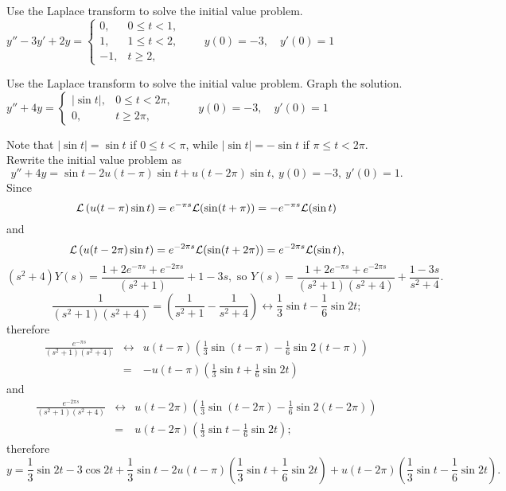 \documentclass{ximera}
\begin{document}
\begin{problem}\label{exer:8.5.5} Use the Laplace transform to solve the initial value problem.
$y''-3y'+2y= \left\{\begin{array}{rl} 0,&0\le
t<1,\\ 1,&1\le t<2,\\ -1,&t\ge 2,\end{array}\right.\qquad y(0)=-3,\quad y'(0)=1$
\end{problem}

\begin{problem}\label{exer:8.5.6} Use the Laplace transform to solve the initial value problem.  Graph the solution. 
$y''+4y= \left\{\begin{array}{cl}|\sin
t|,&0\le t<2\pi,\\ 0,&t\ge 2\pi,\end{array}\right.\qquad
y(0)=-3,\quad y'(0)=1$

\begin{solution}
Note that $|\sin t|=\sin t$ if $0\le t<\pi$, while
 $|\sin t|=-\sin t$ if $\pi\le t<2\pi$. Rewrite the initial value
problem as
$$
y''+4y=\sin t-2u(t-\pi)\sin t+u(t-2\pi)\sin t,\ y(0)=-3,\ y'(0)=1.
$$
Since
$$
{\cal L}\left(u(t-\pi)\sin t\right)=e^{-\pi s}{\cal
L}(\sin(t+\pi))=-e^{-\pi s}{\cal L}(\sin t)
$$
 and
$$
{\cal L}\left(u(t-2\pi)\sin t\right)=e^{-2\pi s}{\cal
L}(\sin(t+2\pi))=e^{-2\pi s}{\cal L}(\sin t),
$$
$$
(s^2+4)Y(s)=\frac{1+2e^{-\pi s}+e^{-2\pi s}}{(s^2+1)}+1-3s,\mbox{ so }
Y(s)=\frac{1+2e^{-\pi s}+e^{-2\pi
s}}{(s^2+1)(s^2+4)}+\frac{1-3s}{s^2+4}.
$$
$$
\frac{1}{(s^2+1)(s^2+4)}=\left(\frac{1}{s^2+1}-\frac{1}{s^2+4}\right)
\leftrightarrow \frac{1}{3}\sin t-\frac{1}{6}\sin2t;
$$
therefore
\begin{eqnarray*}
\frac{e^{-\pi s}}{(s^2+1)(s^2+4)}
&\leftrightarrow&
u(t-\pi)\left(\frac{1}{3}\sin(t-\pi)-\frac{1}{6}\sin2(t-\pi)\right)\\
&=&-u(t-\pi)\left(\frac{1}{3}\sin t+\frac{1}{6}\sin2t\right)
\end{eqnarray*}
and
\begin{eqnarray*}
\frac{e^{-2\pi s}}{(s^2+1)(s^2+4)}
&\leftrightarrow&
u(t-2\pi)\left(\frac{1}{3}\sin(t-2\pi)-\frac{1}{6}\sin2(t-2\pi)\right)\\
&=&u(t-2\pi)\left(\frac{1}{3}\sin t-\frac{1}{6}\sin2t\right);
\end{eqnarray*}
therefore
$$
y=\frac{1}{3}\sin2t-3\cos2t+\frac{1}{3}\sin t
- 2 u(t-\pi)\left(\frac{1}{3}\sin t+\frac{1}{6}\sin2t\right)
+u(t-2\pi)\left(\frac{1}{3}\sin
t-\frac{1}{6}\sin2t\right).
$$
\end{solution}
\end{problem}
\end{document}
